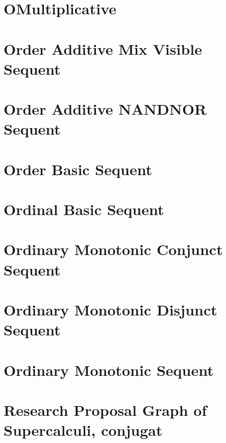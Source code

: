 \documentclass{report}
\begin{document}
\chapter{OMultiplicative}

\chapter{Order Additive Mix Visible Sequent}

\chapter{Order Additive NANDNOR Sequent}

\chapter{Order Basic Sequent}

\chapter{Ordinal Basic Sequent}

\chapter{Ordinary Monotonic Conjunct Sequent}

\chapter{Ordinary Monotonic Disjunct Sequent}

\chapter{Ordinary Monotonic Sequent}

\chapter{Research Proposal Graph of Supercalculi, conjugat}
\end{document}
